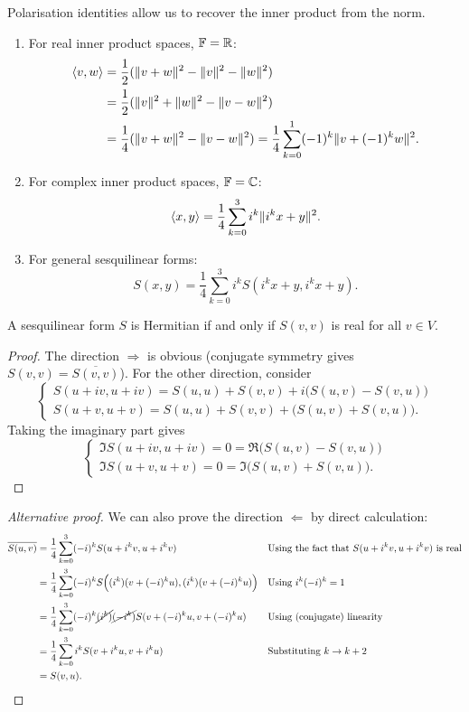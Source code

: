 Polarisation identities allow us to recover the inner product from the norm.
\begin{theorem} \label{polarisationIdentities}
\mbox{}
\begin{enumerate}
\item For real inner product spaces, $\mathbb{F} = \mathbb{R}$:
\begin{align*}
\left\langle v,w \right\rangle &= \frac{1}{2}(\lVert v+w\rVert^2 - \lVert v\rVert^2-\lVert w\rVert^2) \\
&= \frac{1}{2}(\lVert v\rVert^2 + \lVert w\rVert^2-\lVert v-w\rVert^2) \\
&= \frac{1}{4}(\lVert v+w\rVert^2 - \lVert v-w\rVert^2) = \frac{1}{4}\sum_{k=0}^1 (-1)^k\lVert v+(-1)^k w\rVert^2.
\end{align*}
\item For complex inner product spaces, $\mathbb{F} = \mathbb{C}$:
\[ \left\langle x,y \right\rangle = \frac{1}{4}\sum_{k=0}^3 i^k\lVert i^k x+y\rVert^2. \]
\item For general sesquilinear forms:
\[ S(x,y) = \frac{1}{4}\sum_{k=0}^3 i^k S(i^k x+y, i^k x+y). \]
\end{enumerate}
\end{theorem}
\begin{corollary} \label{HermitianRealQuadratic}
A sesquilinear form $S$ is Hermitian \textup{if and only if} $S(v,v)$ is real for all $v\in V$.
\end{corollary}
\begin{proof}
The direction $\Rightarrow$ is obvious (conjugate symmetry gives $S(v,v) = \overline{S(v,v)}$). For the other direction, consider
\[ \begin{cases}
S(u+iv, u+iv) = S(u,u) + S(v,v) + i\Big(S(u,v) - S(v,u)\Big) \\
S(u+v, u+v) = S(u,u) + S(v,v) + \Big(S(u,v) + S(v,u)\Big).
\end{cases} \]
Taking the imaginary part gives
\[ \begin{cases}
\Im S(u+iv, u+iv) = 0 = \Re\Big(S(u,v) - S(v,u)\Big) \\
\Im S(u+v, u+v) = 0 = \Im\Big(S(u,v) + S(v,u)\Big).
\end{cases} \]
\end{proof}
\begin{proof}[Alternative proof]
We can also prove the direction $\Leftarrow$ by direct calculation:
\begin{align*}
\overline{S(u,v)} &= \frac{1}{4}\sum^3_{k=0}(-i)^kS(u+i^kv,u+i^kv) & &\text{Using the fact that $S(u+i^kv,u+i^kv)$ is real} \\
&= \frac{1}{4}\sum^3_{k=0}(-i)^kS\Big((i^k)(v+(-i)^ku),(i^k)(v+(-i)^ku)\Big) & &\text{Using $i^k(-i)^k=1$}\\
&= \frac{1}{4}\sum^3_{k=0}(-i)^k\cancel{(i^k)}\cancel{(-i^k)}S(v+(-i)^ku,v+(-i)^ku) & &\text{Using (conjugate) linearity}\\
&= \frac{1}{4}\sum^3_{k=0}i^kS(v+i^ku,v+i^ku) & &\text{Substituting $k\to k+2$}\\
&= S(v,u).
\end{align*}
\end{proof}
